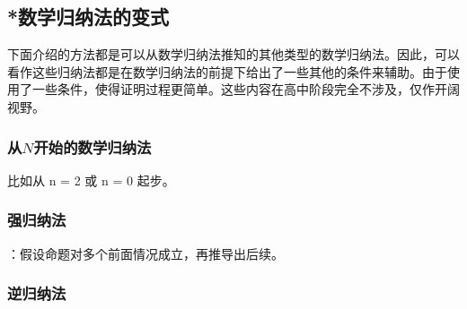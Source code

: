 \subsection{*数学归纳法的变式}

下面介绍的方法都是可以从数学归纳法推知的其他类型的数学归纳法。因此，可以看作这些归纳法都是在数学归纳法的前提下给出了一些其他的条件来辅助。由于使用了一些条件，使得证明过程更简单。这些内容在高中阶段完全不涉及，仅作开阔视野。

\subsubsection{从$N$开始的数学归纳法}
比如从 n = 2 或 n = 0 起步。

\subsubsection{强归纳法}

：假设命题对多个前面情况成立，再推导出后续。

\subsubsection{逆归纳法}
